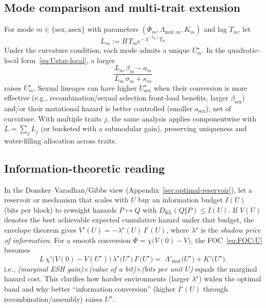 \documentclass[11pt]{article}
\theoremstyle{upright}
\begin{document}
\subsection{Mode comparison and multi-trait extension}
For mode \(m\in\{\mathrm{sex},\mathrm{asex}\}\) with 
parameters \((\Phi_m,\Lambda_{\mathrm{mut},m},K_m)\) and lag \(T_m\), let 
\[L_m := B\,T_m e^{-\Lambda^{(T_m)} T_m}
\]
Under the curvature condition, each mode admits a unique \(U^\star_m\).
In the quadratic-local form~\eqref{eq:Ustar-local}, a larger
\[
\frac{L_m\,\beta_m - a_m}{L_m\,\sigma_m+\kappa_m}
\]
raises \(U^\star_m\). Sexual lineages can have higher \(U^\star_{\mathrm{sex}}\) when their conversion is more effective
(e.g., recombination/sexual selection front-load benefits, larger \(\beta_{\mathrm{sex}}\)) and/or their mutational hazard
is better controlled (smaller \(a_{\mathrm{sex}}\)), net of curvature. With multiple traits \(j\), the same analysis applies
componentwise with \(L=\sum_j L_j\) (or bucketed with a submodular gain), preserving uniqueness and water-filling
allocation across traits.

\subsection{Information-theoretic reading}
In the Donsker--Varadhan/Gibbs view (Appendix~\ref{sec:optimal-reservoir}), let a reservoir or mechanism that scales with \(U\) buy an information budget
\(I(U)\) (bits per block) to reweight hazards \(P\mapsto Q\) with \(D_{\mathrm{KL}}(Q\Vert P)\le I(U)\). If \(V(U)\) denotes the
best achievable expected cumulative hazard under that budget, the envelope theorem gives \(V'(U)=-\lambda^{\star}(U)\,I'(U)\),
where \(\lambda^{\star}\) is the \emph{shadow price of information}. For a smooth conversion \(\Phi=\chi\!\big(V(0)-V\big)\),
the FOC~\eqref{eq:FOC-U} becomes
\[
L\,\chi'\!\big(V(0)-V(U^\star)\big)\,\lambda^{\star}\!\big(U^\star\big)\,I'\!\big(U^\star\big)
=\;
\Lambda'_{\mathrm{mut}}\!\big(U^\star\big)+K'\!\big(U^\star\big).
\]
i.e., \emph{(marginal ESH gain)}\(\times\)\emph{(value of a bit)}\(\times\)\emph{(bits per unit \(U\))} equals the marginal hazard cost.
This clarifies how harder environments (larger \(\lambda^{\star}\)) widen the optimal band and why better ``information conversion''
(higher \(I'(U)\) through recombination/assembly) raises \(U^\star\).



\end{document}
